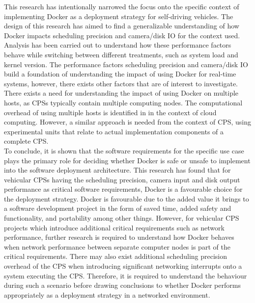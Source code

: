 This research has intentionally narrowed the focus onto the specific context of implementing Docker as a deployment strategy for self-driving vehicles. The design of this research has aimed to find a generalizable understanding of how Docker impacts scheduling precision and camera/disk IO for the context used. Analysis has been carried out to understand how these performance factors behave while switching between different treatments, such as system load and kernel version. The performance factors scheduling precision and camera/disk IO build a foundation of understanding the impact of using Docker for real-time systems, however, there exists other factors that are of interest to investigate. There exists a need for understanding the impact of using Docker on multiple hosts, as CPSs typically contain multiple computing nodes. The computational overhead of using multiple hosts is identified in \cite{p1} in the context of cloud computing. However, a similar approach is needed from the context of CPS, using experimental units that relate to actual implementation components of a complete CPS.\\

To conclude, it is shown that the software requirements for the specific use case plays the primary role for deciding whether Docker is safe or unsafe to implement into the software deployment architecture. This research has found that for vehicular CPSs having the scheduling precision, camera input and disk output performance as critical software requirements, Docker is a favourable choice for the deployment strategy. Docker is favourable due to the added value it brings to a software development project in the form of saved time, added safety and functionality, and portability among other things. However, for vehicular CPS projects which introduce additional critical requirements such as network performance, further research is required to understand how Docker behaves when network performance between separate computer nodes is part of the critical requirements. There may also exist additional scheduling precision overhead of the CPS when introducing significant networking interrupts onto a system executing the CPS. Therefore, it is required to understand the behaviour during such a scenario before drawing conclusions to whether Docker performs appropriately as a deployment strategy in a networked environment.






